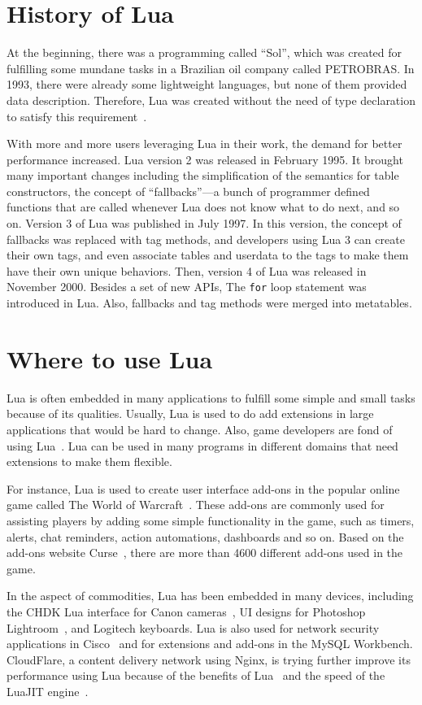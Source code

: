 \section{History of Lua}
At the beginning, there was a programming called ``Sol'', which was created for fulfilling some mundane tasks in a Brazilian oil company called PETROBRAS. In 1993, there were already some lightweight languages, but
none of them provided data description. Therefore, Lua was created without the need of type declaration to satisfy this requirement~\cite{EOL}.

With more and more users leveraging Lua in their work, the demand for better performance increased. Lua version 2 was released in February 1995. It brought many important changes including the simplification of the semantics for table constructors,
the concept of ``fallbacks''---a bunch of programmer defined functions that are called whenever Lua does not know what to do next, and so on. Version 3 of Lua was published in July 1997. In this version, the concept of fallbacks was replaced with tag methods, and developers using Lua 3 can create their own tags, and even associate tables and userdata to the tags to make them have their own unique behaviors. Then, version 4 of Lua was released in November 2000. Besides a set of new APIs, The {\tt for} loop statement was introduced in Lua. 
Also, fallbacks and tag methods were merged into metatables.

\section{Where to use Lua}
Lua is often embedded in many applications to fulfill some simple and small tasks because of its qualities. Usually, Lua is used to do add extensions in large applications that would be hard to change. Also, game developers are fond of using Lua~\cite{AIL}. Lua can be used in many programs in different domains that need extensions to make them flexible. 

For instance, Lua is used to create user interface add-ons in the popular online game called The World of Warcraft~\cite{WLA}. These add-ons are commonly used for assisting players by adding some simple functionality in the game, such as timers, alerts, chat reminders, action automations, dashboards and so on. Based on the add-ons website Curse~\cite{WCU}, there are more than 4600 different add-ons used in the game.

In the aspect of commodities, Lua has been embedded in many devices, including the CHDK Lua interface for Canon cameras~\cite{CLFL}, UI designs for Photoshop Lightroom~\cite{APLL}, and Logitech keyboards. Lua is also used for network security applications in Cisco~\cite{CISCO} and for extensions and add-ons in the MySQL Workbench. CloudFlare, a content delivery network using Nginx, is trying further improve its performance using Lua because of the benefits of Lua~\cite{NPL} and the speed of the LuaJIT engine~\cite{aaa}.


